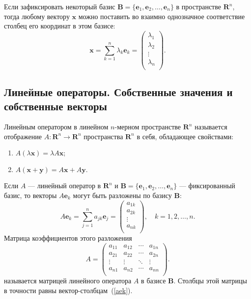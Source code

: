 \documentclass[10pt]{article}
\numberwithin{primer}{section}
\numberwithin{equation}{section}
\begin{document}
Если зафиксировать некоторый базис $\mathbf{B}=\{\mathbf{e}_1,\mathbf{e}_2,\ldots,\mathbf{e}_n\}$ в пространстве $\mathbf{R}^n$, тогда любому вектору $\mathbf{x}$ можно поставить во взаимно однозначное соответствие столбец его координат в этом базисе:
\[
\mathbf{x}=\sum_{k=1}^n\lambda_k\mathbf{e}_k=\begin{pmatrix}
\lambda_{1} \\
\lambda_{2} \\
\vdots \\
\lambda_{n} \\
\end{pmatrix}.
\]

\subsection{Линейные операторы. Собственные значения и собственные векторы}
Линейным оператором в линейном $n$-мерном пространстве $\mathbf{R}^n$ называется отображение $A:\mathbf{R}^n\rightarrow\mathbf{R}^n$ пространства $\mathbf{R}^n$ в себя, обладающее свойствами:
\begin{enumerate}
	\item $A\left(\lambda\mathbf{x}\right)=\lambda A\mathbf{x}$;
	\item $A\left(\mathbf{x}+\mathbf{y}\right)=A\mathbf{x}+A\mathbf{y}$.
\end{enumerate}

Если $A$ --- линейный оператор в $\mathbf{R}^n$ и $\mathbf{B}=\{\mathbf{e}_1,\mathbf{e}_2,\ldots,\mathbf{e}_n\}$ --- фиксированный базис, то векторы $A\mathbf{e}_k$ могут быть разложены по базису $\mathbf{B}$:
\begin{equation}\label{aek}
A\mathbf{e}_k=\sum_{j=1}^n a_{jk}\mathbf{e}_j=\begin{pmatrix}
a_{1k} \\
a_{2k} \\
\vdots \\
a_{nk} \\
\end{pmatrix},\quad k=1,2,\ldots,n.
\end{equation}
Матрица коэффициентов этого разложения
\begin{equation}\label{liop}
A = \begin{pmatrix}
a_{11} & a_{12} & \cdots & a_{1n} \\
a_{21} & a_{22} & \cdots & a_{2n} \\
\vdots & \vdots & \ddots & \vdots \\
a_{n1} & a_{n2} & \cdots & a_{nn} \\
\end{pmatrix}.
\end{equation}
называется матрицей линейного оператора $A$ в базисе $\mathbf{B}$. Столбцы этой матрицы в точности равны вектор-столбцам~(\ref{aek}).
\end{document}
